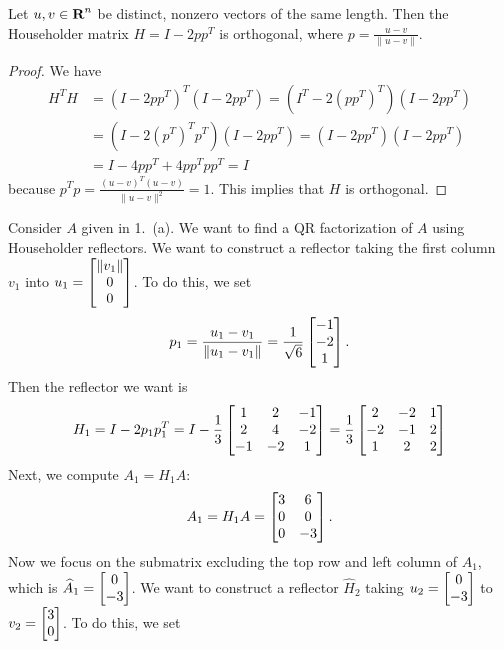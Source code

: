 \documentclass{homework}
\begin{document}
	\question Let $u, v\in\textbf{R}^n$ be distinct, nonzero vectors of the same length. Then the Householder matrix $H = I - 2pp^T$ is orthogonal, where $p = \frac{u - v}{\lVert u - v\rVert}$.
	\begin{proof}
		We have
		\begin{align*}
			H^TH &= (I-2pp^T)^T(I-2pp^T) = (I^T - 2(pp^T)^T)(I-2pp^T) \\
			&= (I- 2(p^T)^Tp^T)(I-2pp^T) = (I-2pp^T)(I-2pp^T) \\
			&= I - 4pp^T + 4pp^Tpp^T = I
		\end{align*}
		because $p^Tp = \frac{(u-v)^T(u-v)}{\lVert u-v\rVert^2} = 1$. This implies that $H$ is orthogonal.
	\end{proof}
	
	\question 
	\begin{alphaparts}
		\questionpart Consider $A$ given in 1.\ (a). We want to find a QR factorization of $A$ using Householder reflectors. We want to construct a reflector taking the first column $v_1$ into $u_1 = \left[\begin{matrix}\lVert v_1\rVert \\ 0 \\ 0\end{matrix}\right]$. To do this, we set 
		\begin{equation*}
			p_1 = \frac{u_1 - v_1}{\lVert u_1-v_1\rVert} = \frac{1}{\sqrt{6}}\left[\begin{matrix}-1 \\ -2 \\ 1\end{matrix}\right].
		\end{equation*}
		Then the reflector we want is
		\begin{equation*}
			H_1 = I - 2p_1p_1^T = I - \frac{1}{3}\left[\begin{matrix}1 & 2 & -1 \\ 2 & 4 & -2 \\ -1 & -2 & 1\end{matrix}\right] = \frac{1}{3}\left[\begin{matrix}2 & -2 & 1 \\ -2 & -1 & 2 \\ 1 & 2 & 2\end{matrix}\right]
		\end{equation*}
		Next, we compute $A_1 = H_1A$:
		\begin{equation*}
			A_1 = H_1A = \left[\begin{matrix}3 & 6 \\ 0 & 0 \\0 & -3\end{matrix}\right].
		\end{equation*}
		Now we focus on the submatrix excluding the top row and left column of $A_1$, which is $\widehat{A}_1 = \left[\begin{matrix}0\\-3\end{matrix}\right]$. We want to construct a reflector $\widehat{H}_2$ taking $u_2 = \left[\begin{matrix}0\\-3\end{matrix}\right]$ to $v_2 = \left[\begin{matrix}3 \\ 0\end{matrix}\right]$. To do this, we set
		\begin{equation*}

\end{equation*}
\end{alphaparts}
\end{document}
